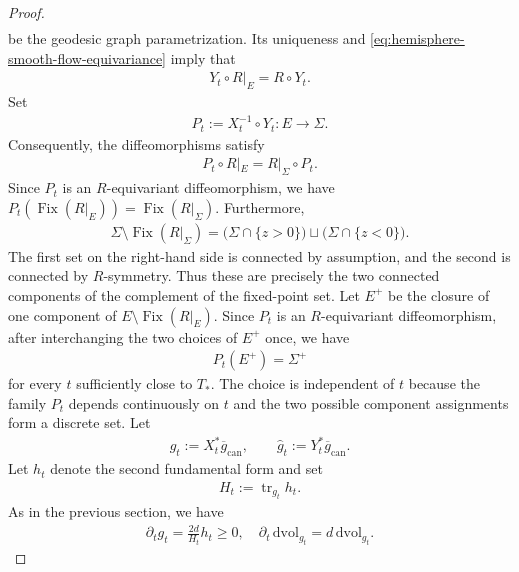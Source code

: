 \documentclass[11pt,reqno]{amsart}
\numberwithin{equation}{section}
\theoremstyle{definition}
\theoremstyle{remark}
\newcommand{\0}{\emptyset}
\newcommand{\can}{\mathrm{can}}
\newcommand{\dvol}{\,\mathrm{dvol}}
\begin{document}
\begin{proof}
\begin{align}
\end{align}
be the geodesic graph parametrization. Its uniqueness and
\eqref{eq:hemisphere-smooth-flow-equivariance} imply that
\begin{align}
        Y_t\circ R|_E
        =
        R\circ Y_t.
\end{align}
Set
\begin{align}
        P_t
        :=
        X_t^{-1}\circ Y_t:
        E\to\Sigma.
\end{align}
Consequently, the diffeomorphisms satisfy
\begin{align}
        P_t\circ R|_E
        =
        R|_\Sigma\circ P_t.
\end{align}
Since $P_t$ is an $R$-equivariant diffeomorphism, we have $ P_t(\operatorname{Fix}(R|_E)) = \operatorname{Fix}(R|_\Sigma).$ Furthermore,
\begin{align}
        \Sigma\setminus\operatorname{Fix}(R|_\Sigma)
        =
        \bigl(\Sigma\cap\{z>0\}\bigr)
        \sqcup
        \bigl(\Sigma\cap\{z<0\}\bigr).
\end{align}
The first set on the right-hand side is connected by assumption, and the
second is connected by $R$-symmetry. Thus these are precisely the two
connected components of the complement of the fixed-point set. Let
$E^+$ be the closure of one component of
$E\setminus\operatorname{Fix}(R|_E)$. Since $P_t$ is an
$R$-equivariant diffeomorphism, after interchanging the two choices of
$E^+$ once, we have
\begin{align}\label{eq:hemisphere-smooth-half-image-prelimit}
        P_t(E^+)
        =
        \Sigma^+
\end{align}
for every $t$ sufficiently close to $T_*$. The choice is independent of $t$ because the family $P_t$ depends continuously on $t$ and the two possible component assignments form a
discrete set. Let
\begin{align}
        g_t:=X_t^*\overline g_{\can},
        \qquad
        \widehat g_t:=Y_t^*\overline g_{\can}.
\end{align}
Let $h_t$ denote the second fundamental form and set
\begin{align}
        H_t
        :=
        \operatorname{tr}_{g_t}h_t.
\end{align}
As in the previous section, we have
\begin{align}\label{eq:hemisphere-smooth-metric-volume-evolution}
        \partial_tg_t
        =
        \frac{2d}{H_t}h_t
        \geq0,
        \quad
        \partial_t\dvol_{g_t}
        =
        d\dvol_{g_t}.

\end{align}
\end{proof}
\end{document}
